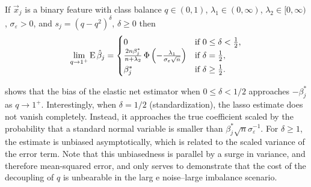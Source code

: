 \begin{theorem}
  \label{thm:classbalance-bias}
  If \(\vec{x}_j\) is a binary feature with class balance \(q \in (0, 1)\), \(\lambda_1 \in (0,\infty)\), \(\lambda_2 \in [0,\infty)\), \(\sigma_\varepsilon > 0\), and \(s_j = (q - q^2)^{\delta}\), \(\delta \geq 0\)  then
  \[
    \lim_{q \rightarrow 1^+} \operatorname{E} \hat{\beta}_j =
    \begin{cases}
      0                                                                                                  & \text{if } 0 \leq \delta < \frac{1}{2}, \\
      \frac{2n \beta_j^*}{n + \lambda_2} \operatorname{\Phi}\left(-\frac{\lambda_1}{\sigma_\varepsilon \sqrt{n}}\right) & \text{if } \delta = \frac{1}{2},        \\
      \beta^*_j                                                                                          & \text{if } \delta \geq \frac{1}{2}.
    \end{cases}
  \]
\end{theorem}

%
 shows that the bias of the elastic net estimator when \(0 \leq \delta < 1/2\) approaches
\(-\beta_j^*\) as \(q \rightarrow 1^+\). Interestingly, when \(\delta = 1/2\) (standardization), the lasso estimate does not vanish completely. Instead, it approaches the
true coefficient scaled by the probability that a standard normal variable is smaller than \(\beta_j^*\sqrt{n}\sigma_\varepsilon^{-1}\). For \(\delta \geq 1\), the
estimate is unbiased asymptotically, which is related to the scaled variance of the error term. Note that this unbiasedness is parallel by a surge in variance, and therefore mean-squared error, and only serves to demonstrate that the cost of the decoupling of \(q\) is unbearable in the larg e noise--large imbalance scenario.

